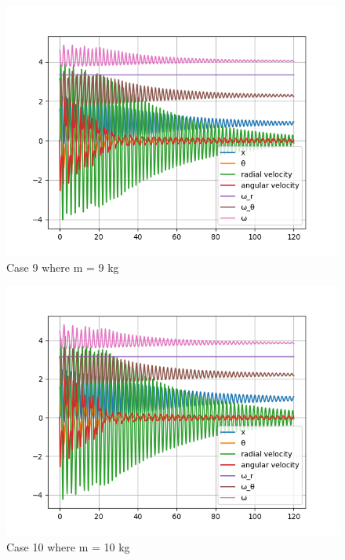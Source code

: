 \begin{figure}[H]
    \centering
    \includegraphics[width=15cm]{SimPictures/m9.png}
    \caption{{Case 9 where m = 9 kg}}
    \label{}
\end{figure}
        
\begin{figure}[H]
    \centering
    \includegraphics[width=15cm]{SimPictures/m10.png}
    \caption{{Case 10 where m = 10 kg}}
    \label{}
\end{figure}
        





